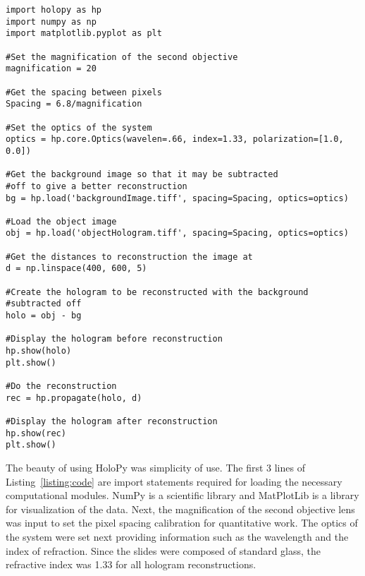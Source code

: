 \begin{Code}[scale=0.75,htbp!]
    \centering
\begin{lstlisting}[caption=Code for a general reconstruction, label=listing:code]
import holopy as hp
import numpy as np
import matplotlib.pyplot as plt

#Set the magnification of the second objective
magnification = 20

#Get the spacing between pixels
Spacing = 6.8/magnification

#Set the optics of the system
optics = hp.core.Optics(wavelen=.66, index=1.33, polarization=[1.0, 0.0])

#Get the background image so that it may be subtracted 
#off to give a better reconstruction
bg = hp.load('backgroundImage.tiff', spacing=Spacing, optics=optics)

#Load the object image
obj = hp.load('objectHologram.tiff', spacing=Spacing, optics=optics)

#Get the distances to reconstruction the image at
d = np.linspace(400, 600, 5)

#Create the hologram to be reconstructed with the background 
#subtracted off
holo = obj - bg

#Display the hologram before reconstruction
hp.show(holo)
plt.show()

#Do the reconstruction
rec = hp.propagate(holo, d)

#Display the hologram after reconstruction
hp.show(rec)
plt.show()

\end{lstlisting}
\end{Code}

The beauty of using HoloPy was simplicity of use. The first 3
lines of Listing~\ref{listing:code} are import statements required for loading
the necessary computational modules.
NumPy is a scientific library and MatPlotLib is a
library 
for visualization of the data. Next, the magnification
of the second objective lens was input
to set the pixel spacing
calibration for quantitative work.
The optics of the system were set next providing
information such as the wavelength and the index of
refraction. Since the slides were composed of standard glass, the refractive
index was 1.33 for all hologram reconstructions.

